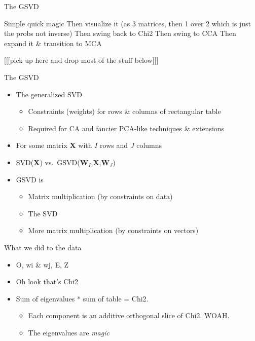 \documentclass[
  ignorenonframetext,
]{beamer}
\providecommand{\tightlist}{%
  \setlength{\itemsep}{0pt}\setlength{\parskip}{0pt}}
\begin{document}
\begin{frame}{The GSVD}
\protect\hypertarget{the-gsvd}{}

Simple quick magic Then visualize it (as 3 matrices, then 1 over 2 which
is just the probs not inverse) Then swing back to Chi2 Then swing to CCA
Then expand it \& transition to MCA

{[}{[}{[}pick up here and drop most of the stuff below{]}{]}{]}

\end{frame}

\begin{frame}{The GSVD}
\protect\hypertarget{the-gsvd-1}{}

\begin{itemize}[<+->]
\tightlist
\item
  The generalized SVD

  \begin{itemize}[<+->]
  \tightlist
  \item
    Constraints (weights) for rows \& columns of rectangular table
  \item
    Required for CA and fancier PCA-like techniques \& extensions
  \end{itemize}
\item
  For some matrix \(\mathbf{X}\) with \(I\) rows and \(J\) columns
\item
  SVD(\(\mathbf{X}\))
  vs.~GSVD(\(\mathbf{W}_{I}\),\(\mathbf{X}\),\(\mathbf{W}_{J}\))
\item
  GSVD is

  \begin{itemize}[<+->]
  \tightlist
  \item
    Matrix multiplication (by constraints on data)
  \item
    The SVD
  \item
    More matrix multiplication (by constraints on vectors)
  \end{itemize}
\end{itemize}

\end{frame}

\begin{frame}{What we did to the data}
\protect\hypertarget{what-we-did-to-the-data}{}

\begin{itemize}[<+->]
\tightlist
\item
  O, wi \& wj, E, Z
\item
  Oh look that's Chi2
\item
  Sum of eigenvalues * sum of table = Chi2.

  \begin{itemize}[<+->]
  \tightlist
  \item
    Each component is an additive orthogonal slice of Chi2. WOAH.
  \item
    The eigenvalues are \emph{magic}
  \end{itemize}
\end{itemize}

\end{frame}
\end{document}
